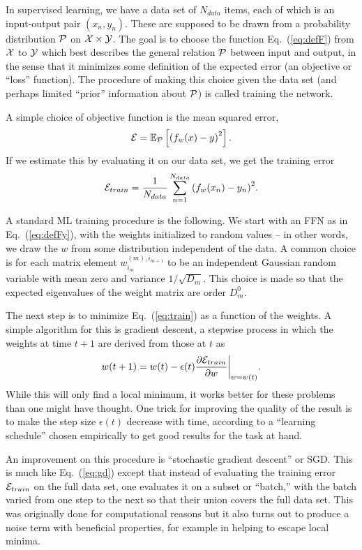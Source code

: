 \documentclass[12pt]{article}
\def\E#1#2{\mathbb{E}_{#1}\left[#2\right]}
\def\CP {{\cal P }}
\def\CX {{\cal X}}
\def\CE {{\cal E}}
\def\CY{{\cal Y}}
\newcommand{\eq}[1]{Eq.~(\ref{eq:#1})}
\newcommand{\be}{\begin{equation}}
\newcommand{\ee}{\end{equation}}
\begin{document}
In supervised learning, we have a data set of $N_{data}$ items, each of which is an input-output pair $(x_n,y_n)$.
These are supposed to be drawn from a probability distribution $\CP$ on $\CX\times\CY$.
The goal is to choose the function \eq{defF} from $\CX$ to $\CY$
which best describes the general relation $\CP$ between input and output,
in the sense that it minimizes some definition of the expected error (an objective or ``loss'' function).
The procedure of making this choice given the data set (and perhaps limited ``prior'' information about $\CP$)
is called training the network.

A simple choice of objective function is the mean squared error, 
\be \label{eq:mse}
\CE = \E{\CP}{ \left(f_w(x) - y\right)^2 }.
\ee
If we estimate this by evaluating it on our data set, we get the training error
\be \label{eq:train}
\CE_{train} =  \frac{1}{N_{data}} \sum_{n=1}^{N_{data}}{ \left(f_w(x_n) - y_n\right)^2 }.
\ee

A standard ML training procedure is the following.  We start with an FFN as in \eq{defFy},
with the weights initialized to random values -- in other words, we draw the $w$ from some distribution
independent of the data.  A common choice is for each matrix element $w_{i_m}^{(m),i_{m+1}}$ to be
an independent Gaussian random variable with mean zero and variance $1/\sqrt{D_m}$.  This choice is made so that
the expected eigenvalues of the weight matrix are order $D_m^0$.

The next step is to minimize \eq{train} as a function of the weights.  A simple algorithm for this is
gradient descent, a stepwise process in which the weights at time $t+1$ are derived from those at $t$ as
\be \label{eq:gd}
w({t+1}) = w({t}) - \epsilon(t) \frac{ \partial \CE_{train} } { \partial w }\bigg|_{w=w(t)} .
\ee 
While this will only find a local minimum, it works better for these problems than one might have thought.
One trick for improving the quality of the result is
to make the step size $\epsilon(t)$ decrease with time, according to a ``learning schedule''
chosen empirically to get good results for the task at hand.

An improvement on this procedure is ``stochastic gradient descent'' or SGD.  This is much like \eq{gd}
except that instead of evaluating the training error $\CE_{train}$ on the full data set, one evaluates it on
a subset or ``batch,'' with the batch varied from one step to the next so that their union covers the full data set.  This was
originally done for computational reasons but it also turns out to produce a noise term with beneficial 
properties, for example in helping to escape local minima.  
\end{document}
